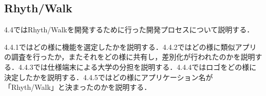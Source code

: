 \subsection{Rhyth/Walk}
\par
4.4ではRhyth/Walkを開発するために行った開発プロセスについて説明する．\par
4.4.1ではどの様に機能を選定したかを説明する．4.4.2ではどの様に類似アプリの調査を行ったか，またそれをどの様に共有し，差別化が行われたのかを説明する．4.4.3では仕様端末による大学の分担を説明する．4.4.4ではロゴをどの様に決定したかを説明する．4.4.5ではどの様にアプリケーション名が「Rhyth/Walk」と決まったのかを説明する．\par
{}
